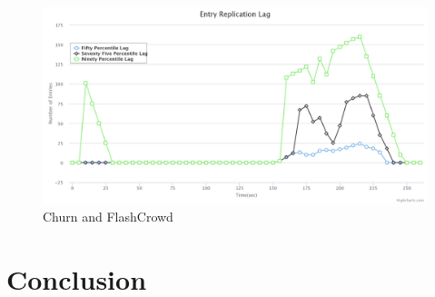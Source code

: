\documentclass[a4paper,11pt]{kth-mag}
\begin{document}
\begin{figure}[h]
	\includegraphics[scale=0.20]{Churn200-40Nodes-1-40-20-20}
	\caption{Churn and FlashCrowd}
	\label{fig:flashChurn}
\end{figure}



\chapter{Conclusion}
\label{chap:conclusion}
\end{document}
